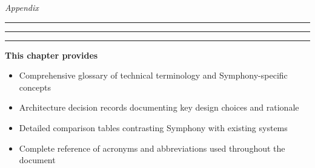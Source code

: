 
\vspace{2cm}

\begin{center}
\end{center}

\vspace{1cm}

\begin{center}
{\fontsize{28}{32}\selectfont\textcolor{brandPrimary}{\textit{Appendix}}}
\end{center}

\vspace{0.5cm}

\begin{center}
\textcolor{brandAccent}{
\rule{2cm}{0.8pt} \quad
\raisebox{-0.2ex}{\Large$\bullet$} \quad
\rule{4cm}{0.8pt} \quad
\raisebox{-0.2ex}{\Large$\bullet$} \quad
\rule{2cm}{0.8pt}
}
\end{center}

\vspace{2cm}

\begin{tcolorbox}[
    enhanced,
    colback=white,
    colframe=brandTertiary!40,
    boxrule=1pt,
    arc=12pt,
    drop shadow={brandTertiary!20},
    left=1.5cm,
    right=1.5cm,
    top=1.2cm,
    bottom=1.2cm,
    before upper={\parindent0pt}
]
\begin{center}
{\Large\textbf{\textcolor{brandTertiary}{This chapter provides}}}
\end{center}

\vspace{0.8cm}

\begin{itemize}[leftmargin=1.2cm, itemsep=0.4cm, label={\textcolor{brandAccent}{$\triangleright$}}]
    \item {\large Comprehensive glossary of technical terminology and Symphony-specific concepts}
    \item {\large Architecture decision records documenting key design choices and rationale}
    \item {\large Detailed comparison tables contrasting Symphony with existing systems}
    \item {\large Complete reference of acronyms and abbreviations used throughout the document}
\end{itemize}
\end{tcolorbox}

\clearpage
